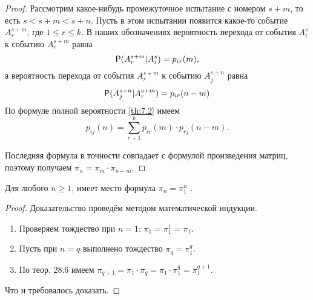 \begin{proof}
Рассмотрим какое-нибудь промежуточное испытание с номером $s + m$, то есть $s < s + m < s + n$. Пусть в этом испытании появится какое-то событие $A^{s+m}_r$, где $1 \leq r \leq k$. В наших обозначениях вероятность перехода от события $A^s_i$ к событию $A^{s+m}_r$ равна
$$\P(A^{s+m}_r|A^s_i) = p_{ir}(m),$$
а вероятность перехода от события $A^{s+m}_r$ к событию $A^{s+n}_j$ равна
$$\P(A^{s+n}_j|A^{s+m}_r) = p_{ir}(n-m)$$
По формуле полной вероятности \ref{th:7.2} имеем
$$p_{ij}(n) = \sum\limits_{r+1}^k p_{ir}(m) \cdot p_{rj}(n-m).$$

Последняя формула в точности совпадает с формулой произведения матриц, поэтому получаем $\pi_n = \pi_m \cdot \pi_{n−m} .$
\end{proof} 

\begin{theorem}
\label{th:28.7}
 	Для любого $n \geq 1$, имеет место формула $\pi_n = \pi_1^n$ .
 \end{theorem} 

\begin{proof}
Доказательство проведём методом математической индукции.
\begin{enumerate}
	\item Проверяем тождество при $n = 1$: $\pi_1 = \pi^1_1 = \pi_1$.
	\item Пусть при $n = q$ выполнено тождество $\pi_q = \pi_1^q .$
	\item По теор. 28.6 имеем $\pi_{q+1} = \pi_1 \cdot \pi_q = \pi_1 \cdot \pi_1^q = \pi_1^{q+1}$.
\end{enumerate}
Что и требовалось доказать.
\end{proof}